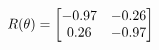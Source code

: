 \documentclass[preview]{standalone}
\begin{document}
\begin{align*}
\special{dvisvgm:raw <g id='unique000'>}R(\theta) = \begin{bmatrix}-0.97 & -0.26\\0.26 & -0.97\end{bmatrix}\special{dvisvgm:raw </g>}
\end{align*}
\end{document}

